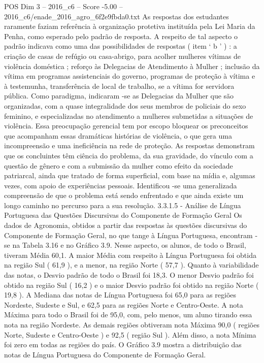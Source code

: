 \begin{textsample}{POS Dim 3 – 2016\_c6 – Score -5.00 – 2016\_c6/enade\_2016\_agro\_6f2e9fbda0.txt}
As respostas dos estudantes raramente faziam referência à organização protetiva instituída pela Lei Maria da Penha, como esperado pelo padrão de resposta.
A respeito de tal aspecto o padrão indicava como uma das possibilidades de respostas ( item ‘ b ’ ) : a criação de casas de refúgio ou casa-abrigo, para acolher mulheres vítimas de violência doméstica ; reforço às Delegacias de Atendimento à Mulher ; inclusão da vítima em programas assistenciais do governo, programas de proteção à vítima e à testemunha, transferência de local de trabalho, se a vítima for servidora pública.
Como paradigma, indicaram -se as Delegacias da Mulher que são organizadas, com a quase integralidade dos seus membros de policiais do sexo feminino, e especializadas no atendimento a mulheres submetidas a situações de violência.
Essa preocupação gerencial tem por escopo bloquear os preconceitos que acompanham essas dramáticas histórias de violência, o que gera uma incompreensão e uma ineficiência na rede de proteção.
As respostas demonstram que os concluintes têm ciência do problema, da sua gravidade, do vínculo com a questão de gênero e com a submissão da mulher como efeito da sociedade patriarcal, ainda que tratado de forma superficial, com base na mídia e, algumas vezes, com apoio de experiências pessoais.
Identificou -se uma generalizada compreensão de que o problema está sendo enfrentado e que ainda existe um longo caminho no percurso para a sua resolução. 3.3.1.5 - Análise de Língua Portuguesa das Questões Discursivas do Componente de Formação Geral Os dados de Agronomia, obtidos a partir das respostas às questões discursivas do Componente de Formação Geral, no que tange à Língua Portuguesa, encontram -se na Tabela 3.16 e no Gráfico 3.9.
Nesse aspecto, os alunos, de todo o Brasil, tiveram Média 60,1.
A maior Média com respeito à Língua Portuguesa foi obtida na região Sul ( 61,9 ), e a menor, na região Norte ( 57,7 ).
Quanto à variabilidade das notas, o Desvio padrão de todo o Brasil foi 18,3.
O menor Desvio padrão foi obtido na região Sul ( 16,2 ) e o maior Desvio padrão foi obtido na região Norte ( 19,8 ).
A Mediana das notas de Língua Portuguesa foi 65,0 para as regiões Nordeste, Sudeste e Sul, e 62,5 para as regiões Norte e Centro-Oeste.
A nota Máxima para todo o Brasil foi de 95,0, com, pelo menos, um aluno tirando essa nota na região Nordeste.
As demais regiões obtiveram nota Máxima 90,0 ( regiões Norte, Sudeste e Centro-Oeste ) e 92,5 ( região Sul ).
Além disso, a nota Mínima foi zero em todas as regiões do país.
O Gráfico 3.9 mostra a distribuição das notas de Língua Portuguesa do Componente de Formação Geral.

\end{textsample}
